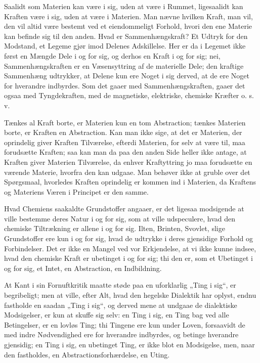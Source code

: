 \documentclass[12pt]{book}
\newcommand{\opage}[1]{\marginnote{\footnotesize\textit{[#1]}}}
\begin{document}
\opage{62} Saalidt som Materien kan være i sig, uden at være i Rummet, ligesaalidt kan Kraften
være i sig, uden at være i Materien. Man nævne hvilken Kraft, man vil, den vil altid
være bestemt ved et eiendommeligt Forhold, hvori den ene Materie kan befinde sig til
den anden. Hvad er Sammenhængskraft? Et Udtryk for den Modstand, et Legeme gjør imod
Delenes Adskillelse. Her er da i Legemet ikke først en Mængde Dele i og for sig, og
derhos en Kraft i og for sig; nei, Sammenhængskraften er en Væsensyttring af de
materielle Dele; den kraftige Sammenhæng udtrykker, at Delene kun ere Noget i sig
derved, at de ere Noget for hverandre indbyrdes. Som det gaaer med
Sammenhængskraften, gaaer det ogsaa med Tyngdekraften, med de magnetiske, elektriske,
chemiske Kræfter o. s. v.

Tænkes al Kraft borte, er Materien kun en tom Abstraction; tænkes Materien borte, er
Kraften en Abstraction. Kan man ikke sige, at det er Materien, der oprindelig giver
Kraften Tilværelse, efterdi Materien, for selv at være til, maa forudsætte Kraften;
saa kan man da paa den anden Side heller ikke antage, at Kraften giver Materien
Tilværelse, da enhver Kraftyttring jo maa forudsætte en værende Materie, hvorfra den
kan udgaae. Man behøver ikke at gruble over det Spørgsmaal, hvorledes Kraften
oprindelig er kommen ind i Materien, da Kraftens og Materiens Væren i Principet er den
samme.

Hvad Chemiens saakaldte Grundstoffer angaaer, er det ligesaa modsigende at ville
bestemme deres Natur i og for sig, som at ville udspeculere, hvad den chemiske
Tiltrækning er allene i og for sig. Ilten, Brinten, Svovlet, slige Grundstoffer ere
kun i og for sig, hvad de udtrykke i deres gjensidige Forhold og Forbindelser. Det er
ikke en Mangel ved vor Erkjendelse, at vi ikke kunne indsee, hvad den chemiske Kraft
er ubetinget i og for sig; thi den er, som et Ubetinget i og for sig, et Intet, en
Abstraction, en Indbildning.

\opage{63} At Kant i sin Fornuftkritik maatte støde paa en uforklarlig „Ting i sig“, er
begribeligt; men at ville, efter Alt, hvad den hegelske Dialektik har oplyst, endnu
fastholde en saadan „Ting i sig“, og derved mene at undgaae de dialektiske
Modsigelser, er kun at skuffe sig selv: en Ting i sig, en Ting bag ved alle
Betingelser, er en lovløs Ting; thi Tingene ere kun under Loven, forsaavidt de med
indre Nødvendighed ere for hverandre indbyrdes, og betinge hverandre gjensidig; en
Ting i sig, en ubetinget Ting, er ikke blot en Modsigelse, men, naar den fastholdes,
en Abstractionsforhærdelse, en Uting.
\end{document}
